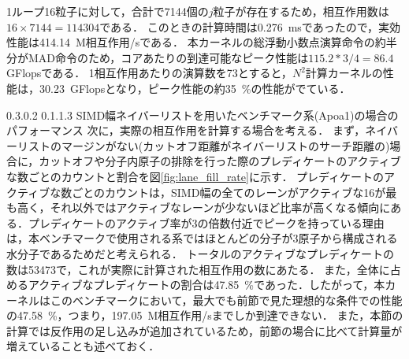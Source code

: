 \documentclass[uplatex,11pt,a4j,titlepage,oneside,openright,dvipdfmx]{jsbook}
\makeatletter
\renewcommand{\subsection}{%
   \@startsection{subsection}{1}{\z@}%
   {0.3\Cvs \@plus.0\Cdp \@minus.2\Cdp}%
   {0.1\Cvs \@plus.1\Cdp \@minus.3\Cdp}%
   {\reset@font\large\bfseries}}%
\makeatother
\begin{document}
1ループ16粒子に対して，合計で7144個の$j$粒子が存在するため，相互作用数は$16 \times 7144 = 114304$である．
このときの計算時間は\mbox{0.276 ms}であったので，実効性能は\mbox{414.14 M相互作用/s}である．
本カーネルの総浮動小数点演算命令の約半分がMAD命令のため，コアあたりの到達可能なピーク性能は$115.2 * 3 / 4 = 86.4$ GFlopsである．
1相互作用あたりの演算数を73とすると，$N^2$計算カーネルの性能は，\mbox{30.23 GFlops}となり，ピーク性能の約\mbox{35 \%}の性能がでている．


\subsection{SIMD幅ネイバーリストを用いたベンチマーク系(Apoa1)の場合のパフォーマンス}
次に，実際の相互作用を計算する場合を考える．
まず，ネイバーリストのマージンがない(カットオフ距離がネイバーリストのサーチ距離の)場合に，カットオフや分子内原子の排除を行った際のプレディケートのアクティブな数ごとのカウントと割合を図\ref{fig:lane_fill_rate}に示す．
プレディケートのアクティブな数ごとのカウントは，SIMD幅の全てのレーンがアクティブな16が最も高く，それ以外ではアクティブなレーンが少ないほど比率が高くなる傾向にある．プレディケートのアクティブ率が3の倍数付近でピークを持っている理由は，本ベンチマークで使用される系ではほとんどの分子が3原子から構成される水分子であるためだと考えられる．
トータルのアクティブなプレディケートの数は53473で，これが実際に計算された相互作用の数にあたる．
また，全体に占めるアクティブなプレディケートの割合は\mbox{47.85 \%}であった．したがって，本カーネルはこのベンチマークにおいて，最大でも前節で見た理想的な条件での性能の\mbox{47.58 \%}，つまり，\mbox{197.05 M相互作用/s}までしか到達できない．
また，本節の計算では反作用の足し込みが追加されているため，前節の場合に比べて計算量が増えていることも述べておく．
\end{document}

